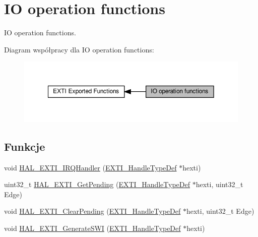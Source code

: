 \hypertarget{group___e_x_t_i___exported___functions___group2}{}\section{IO operation functions}
\label{group___e_x_t_i___exported___functions___group2}


IO operation functions.  


Diagram współpracy dla IO operation functions\+:\nopagebreak
\begin{figure}[H]
\begin{center}
\leavevmode
\includegraphics[width=350pt]{group___e_x_t_i___exported___functions___group2}
\end{center}
\end{figure}
\subsection*{Funkcje}
\begin{DoxyCompactItemize}
\item 
void \hyperlink{group___e_x_t_i___exported___functions___group2_ga241422a810a8e2aeb0cd8467145d33bb}{H\+A\+L\+\_\+\+E\+X\+T\+I\+\_\+\+I\+R\+Q\+Handler} (\hyperlink{struct_e_x_t_i___handle_type_def}{E\+X\+T\+I\+\_\+\+Handle\+Type\+Def} $\ast$hexti)
\item 
uint32\+\_\+t \hyperlink{group___e_x_t_i___exported___functions___group2_ga96319c70ad567d85105e4608f8b0887e}{H\+A\+L\+\_\+\+E\+X\+T\+I\+\_\+\+Get\+Pending} (\hyperlink{struct_e_x_t_i___handle_type_def}{E\+X\+T\+I\+\_\+\+Handle\+Type\+Def} $\ast$hexti, uint32\+\_\+t Edge)
\item 
void \hyperlink{group___e_x_t_i___exported___functions___group2_gaa99dea85ad2aea36f0abbe022a82664d}{H\+A\+L\+\_\+\+E\+X\+T\+I\+\_\+\+Clear\+Pending} (\hyperlink{struct_e_x_t_i___handle_type_def}{E\+X\+T\+I\+\_\+\+Handle\+Type\+Def} $\ast$hexti, uint32\+\_\+t Edge)
\item 
void \hyperlink{group___e_x_t_i___exported___functions___group2_ga6deebffde84bc80fa9ff1b7faa38615a}{H\+A\+L\+\_\+\+E\+X\+T\+I\+\_\+\+Generate\+S\+WI} (\hyperlink{struct_e_x_t_i___handle_type_def}{E\+X\+T\+I\+\_\+\+Handle\+Type\+Def} $\ast$hexti)
\end{DoxyCompactItemize}


